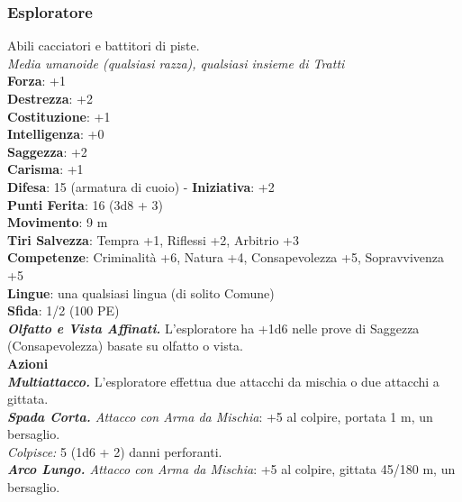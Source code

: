 \begin{multicols}{2}
\subsubsection{Esploratore}
Abili cacciatori e battitori di piste.\\
\emph{Media umanoide (qualsiasi razza), qualsiasi insieme di Tratti}\\
\textbf{Forza}: +1\\
\textbf{Destrezza}: +2\\
\textbf{Costituzione}: +1\\
\textbf{Intelligenza}: +0\\
\textbf{Saggezza}: +2\\
\textbf{Carisma}: +1\\
\textbf{Difesa}: 15 (armatura di cuoio) - \textbf{Iniziativa}: +2\\
\textbf{Punti Ferita}: 16 (3d8 + 3)\\
\textbf{Movimento}: 9 m\\
\textbf{Tiri Salvezza}: Tempra +1, Riflessi +2, Arbitrio +3 \\
\textbf{Competenze}: Criminalità +6, Natura +4, Consapevolezza +5, Sopravvivenza +5\\
\textbf{Lingue}: una qualsiasi lingua (di solito Comune)\\
\textbf{Sfida}: 1/2 (100 PE)\smallskip\\
\emph{\textbf{Olfatto e Vista Affinati.}} L'esploratore ha +1d6 nelle prove di Saggezza (Consapevolezza) basate su olfatto o vista.\\
\smallskip\textbf{Azioni}\\
\emph{\textbf{Multiattacco.}} L'esploratore effettua due attacchi da mischia o due attacchi a gittata.\\
\emph{\textbf{Spada Corta.} Attacco con Arma da Mischia}: +5 al colpire, portata 1 m, un bersaglio.\\
\emph{Colpisce:} 5 (1d6 + 2) danni perforanti.\\
\emph{\textbf{Arco Lungo.} Attacco con Arma da Mischia}: +5 al colpire, gittata 45/180 m, un bersaglio.\\

\end{multicols}
